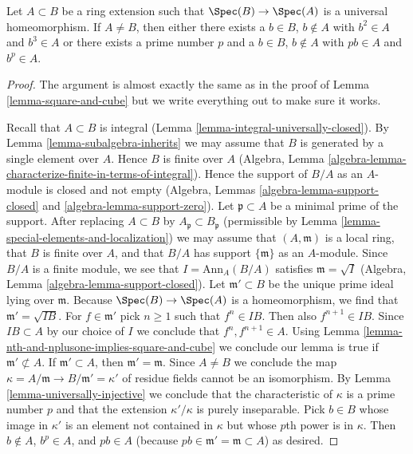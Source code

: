 \begin{lemma}
\label{lemma-pth-power-and-multiple}
Let $A \subset B$ be a ring extension such that $\Spec(B) \to \Spec(A)$
is a universal homeomorphism.
If $A \not = B$, then either there exists a $b \in B$, $b \not \in A$ with
$b^2 \in A$ and $b^3 \in A$ or there exists a prime number $p$
and a $b \in B$, $b \not \in A$ with $pb \in A$ and $b^p \in A$.
\end{lemma}

\begin{proof}
The argument is almost exactly the same as in the proof of
Lemma \ref{lemma-square-and-cube} but we write everything
out to make sure it works.

\medskip\noindent
Recall that $A \subset B$ is integral
(Lemma \ref{lemma-integral-universally-closed}).
By Lemma \ref{lemma-subalgebra-inherits}
we may assume that $B$ is generated by a single element
over $A$. Hence $B$ is finite over $A$
(Algebra, Lemma \ref{algebra-lemma-characterize-finite-in-terms-of-integral}).
Hence the support of $B/A$ as an $A$-module is
closed and not empty (Algebra, Lemmas
\ref{algebra-lemma-support-closed} and \ref{algebra-lemma-support-zero}).
Let $\mathfrak p \subset A$ be a minimal prime
of the support. After replacing $A \subset B$ by
$A_\mathfrak p \subset B_\mathfrak p$ (permissible by
Lemma \ref{lemma-special-elements-and-localization})
we may assume that $(A, \mathfrak m)$ is a local ring,
that $B$ is finite over $A$, and that $B/A$ has support $\{\mathfrak m\}$
as an $A$-module. Since $B/A$ is a finite module,
we see that $I = \text{Ann}_A(B/A)$ satisfies $\mathfrak m = \sqrt{I}$
(Algebra, Lemma \ref{algebra-lemma-support-closed}).
Let $\mathfrak m' \subset B$ be the unique prime ideal lying over
$\mathfrak m$. Because $\Spec(B) \to \Spec(A)$ is a homeomorphism,
we find that $\mathfrak m' = \sqrt{IB}$.
For $f \in \mathfrak m'$ pick $n \geq 1$ such that
$f^n \in IB$. Then also $f^{n + 1} \in IB$.
Since $IB \subset A$ by our choice of $I$ we conclude that
$f^n, f^{n + 1} \in A$. Using
Lemma \ref{lemma-nth-and-nplusone-implies-square-and-cube}
we conclude our lemma is true if $\mathfrak m' \not \subset A$.
If $\mathfrak m' \subset A$, then $\mathfrak m' = \mathfrak m$.
Since $A \not = B$ we conclude the map
$\kappa = A/\mathfrak m \to B/\mathfrak m' = \kappa'$
of residue fields cannot be an isomorphism. By
Lemma \ref{lemma-universally-injective} we conclude
that the characteristic of $\kappa$ is a prime number $p$
and that the extension $\kappa'/\kappa$ is purely inseparable.
Pick $b \in B$ whose image in $\kappa'$ is an element
not contained in $\kappa$ but whose $p$th power is in $\kappa$.
Then $b \not \in A$, $b^p \in A$, and $pb \in A$
(because $pb \in \mathfrak m' = \mathfrak m \subset A$)
as desired.
\end{proof}

